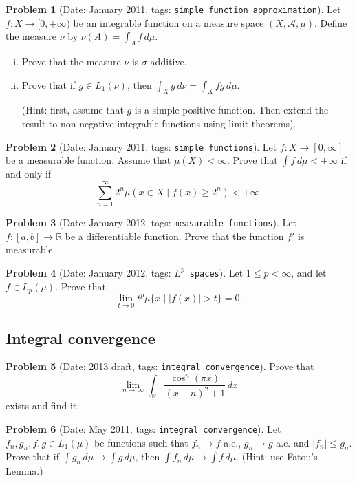 \documentclass[11pt, notitlepage]{article}
\theoremstyle{definition}
\theoremstyle{definition}
\theoremstyle{definition}
\newtheorem{probstate}{Problem}
\theoremstyle{remark}
\newenvironment{problem}[2]{
    \begin{probstate}[Date: #1, tags: {\color{white} \texttt{#2}}]
}
{
  \end{probstate}
}
\newcommand{\R}{\mathbb{R}}
\begin{document}
\begin{problem}{January 2011}{simple function approximation}
  Let $f:X \to [0, +\infty)$ be an integrable function on
    a measure space $(X, \mathcal{A},\mu)$.
    Define the measure $\nu$ by $\nu(A)=\int_A f \, d \mu$.
    \begin{enumerate}[(i)]
        \item Prove that the measure $\nu$ is $\sigma$-additive.

        \item Prove that if
        $g \in L_1(\nu)$, then
        $\int_X g \, d \nu =\int_X fg \, d \mu$.

        (Hint: first, assume that $g$ is a simple positive
        function. Then extend the result to non-negative
        integrable functions using limit theorems).
    \end{enumerate}
\end{problem}

\begin{problem}{January 2011}{simple functions}
  Let $f:X \to [0, \infty]$ be a measurable
 function. Assume that $\mu (X) < \infty$.
 Prove that $\int f \, d \mu< +\infty$ if and only if
 \[
 \sum_{n=1}^{\infty} 2^n \mu (x \in X \mid f(x) \ge 2^n) < +\infty.
 \]
\end{problem}

\begin{problem}{January 2012}{measurable functions}
  Let $f : [a,b] \to \R$ be a differentiable function.  Prove that the function $f'$ is measurable.
\end{problem}

\begin{problem}{January 2012}{$L^p$ spaces}
  Let $1 \le p < \infty$, and let $f \in L_p(\mu)$. Prove that
\[
 \lim_{t \to 0} t^p \mu \{x \mid |f(x)|>t \} =0.
\]
\end{problem}

\subsection{Integral convergence}

\begin{problem}{2013 draft}{integral convergence}
Prove that
  \[
   \lim_{n \to \infty} \int_\R \frac{\cos^{n} (\pi  x)}{(x-n)^2+1} \, dx
  \]
  exists and find it.
\end{problem}

\begin{problem}{May 2011}{integral convergence}
  Let $f_n,g_n,f,g \in L_1(\mu)$ be functions such that
    $f_n \to f$ a.e., $g_n \to g$ a.e. and $|f_n| \le g_n$. Prove
    that if $\int g_n \, d \mu \to \int g \, d \mu$, then
    $\int f_n \, d \mu \to \int f \, d \mu$.
    (Hint: use Fatou's Lemma.)
\end{problem}
\end{document}
